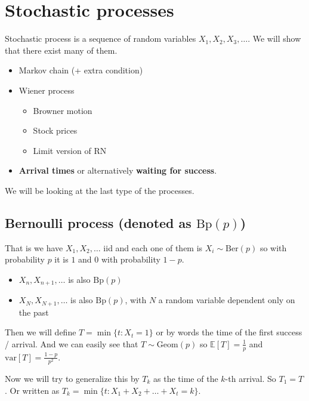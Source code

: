 \chapter{Stochastic processes}

Stochastic process is a sequence of random variables $X_{1}, X_{2}, X_{3}, \dots$. We will show that there exist many of them.

\begin{itemize}
	\item Markov chain (+ extra condition)
	\item Wiener process
	\begin{itemize}
		\item Browner motion
		\item Stock prices
		\item Limit version of RN
	\end{itemize}
	\item \textbf{Arrival times} or alternatively \textbf{waiting for success}.
\end{itemize}

We will be looking at the last type of the processes.

\section{Bernoulli process (denoted as $\text{Bp}(p)$)}

That is we have $X_{1}, X_{2}, \dots$ iid and each one of them is $X_{i} \sim \text{Ber}(p)$ so with probability $p$ it is $1$ and $0$ with probability $1-p$.

\begin{observ}
	\begin{itemize}
		\item $X_{n}, X_{n+1}, \dots$ is also $\text{Bp}(p)$
		\item $X_{N}, X_{N+1}, \dots$ is also $\text{Bp}(p)$, with $N$ a random variable dependent only on the past
	\end{itemize}
\end{observ}

Then we will define $T =\min \{t : X_{t} = 1\}$ or by words the time of the first success / arrival. And we can easily see that $T \sim \text{Geom}(p)$ so $\mathbb{E}[T] = \frac{1}{p}$ and $\text{var} [T] = \frac{1-p}{p^{2}}$.

Now we will try to generalize this by $T_{k}$ as the time of the $k$-th arrival. So $T_{1} = T$. Or written as $T_{k} = \min \{t : X_{1} + X_{2} + \dots + X_{t} = k\}$.

